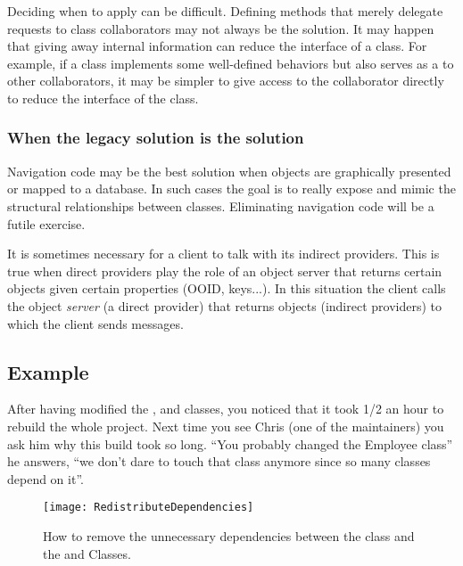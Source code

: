 \documentclass[a4paper,10pt,twoside]{book}
\begin{document}
\begin{bulletlist}
\item Deciding when to apply  can be difficult. Defining methods that merely delegate requests to class collaborators may not always be the solution. It may happen that giving away internal information can reduce the interface of a class. For example, if a class implements some well-defined behaviors but also serves as a  to other collaborators, it may be simpler to give access to the collaborator directly to reduce the interface of the class.
\end{bulletlist}

\subsubsection*{When the legacy solution is the solution}

Navigation code may be the best solution when objects are graphically presented or mapped to a database. In such cases the goal is to really expose and mimic the structural relationships between classes. Eliminating navigation code will be a futile exercise. 

It is sometimes necessary for a client to talk with its indirect providers. This is true when direct providers play the role of an object server that returns certain objects given certain properties (OOID, keys...). In this situation the client calls the object \emph{server} (a direct provider) that returns objects (indirect providers) to which the client sends messages. 

\subsection*{Example}

After having modified the ,  and  classes, you noticed that it took 1/2 an hour to rebuild the whole project. Next time you see Chris (one of the maintainers) you ask him why this build took so long. ``You probably changed the Employee class'' he answers, ``we don't dare to touch that class anymore since so many classes depend on it''.

\begin{figure}
\begin{center}
\texttt{[image: RedistributeDependencies]}
\caption{How to remove the unnecessary dependencies between the  class and the  and  Classes.}
\end{center}
\end{figure}
\end{document}
